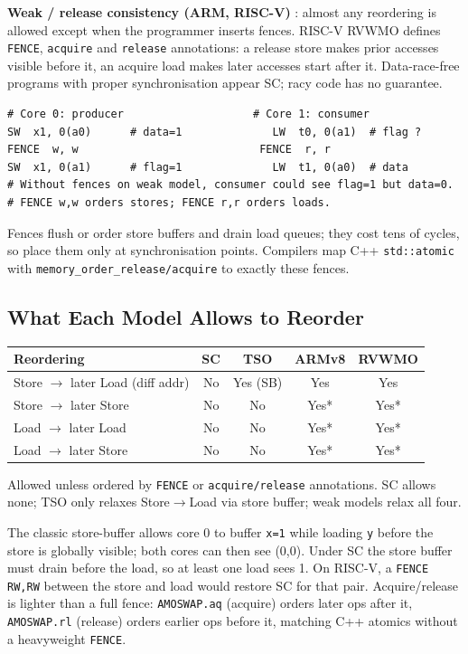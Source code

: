 \textbf{Weak / release consistency (ARM, RISC-V) }: almost any reordering is allowed except when the programmer inserts fences. RISC-V RVWMO defines \texttt{FENCE}, \texttt{acquire} and \texttt{release} annotations: a release store makes prior accesses visible before it, an acquire load makes later accesses start after it. Data-race-free programs with proper synchronisation appear SC; racy code has no guarantee.

\begin{lstlisting}[language={[x86masm]Assembler}, caption={Fences restore ordering in RISC-V}, label={lst:fence}]
# Core 0: producer                    # Core 1: consumer
SW  x1, 0(a0)      # data=1              LW  t0, 0(a1)  # flag ?
FENCE  w, w                            FENCE  r, r
SW  x1, 0(a1)      # flag=1              LW  t1, 0(a0)  # data
# Without fences on weak model, consumer could see flag=1 but data=0.
# FENCE w,w orders stores; FENCE r,r orders loads.
\end{lstlisting}

Fences flush or order store buffers and drain load queues; they cost tens of cycles, so place them only at synchronisation points. Compilers map C++ \texttt{std::atomic} with \texttt{memory\_order\_release/acquire} to exactly these fences.

\subsection{What Each Model Allows to Reorder}
\begin{center}
\begin{tabular}{lcccc}
\toprule Reordering & SC & TSO & ARMv8 & RVWMO \\ \midrule
Store $\to$ later Load (diff addr) & No & Yes (SB) & Yes & Yes \\
Store $\to$ later Store & No & No & Yes* & Yes* \\
Load $\to$ later Load & No & No & Yes* & Yes* \\
Load $\to$ later Store & No & No & Yes* & Yes* \\ \bottomrule
\end{tabular}
\end{center}
{\footnotesize *Allowed unless ordered by \texttt{FENCE} or \texttt{acquire/release} annotations. SC allows none; TSO only relaxes Store$\to$Load via store buffer; weak models relax all four.}

The classic store-buffer allows core 0 to buffer \texttt{x=1} while loading \texttt{y} before the store is globally visible; both cores can then see (0,0). Under SC the store buffer must drain before the load, so at least one load sees 1. On RISC-V, a \texttt{FENCE RW,RW} between the store and load would restore SC for that pair. Acquire/release is lighter than a full fence: \texttt{AMOSWAP.aq} (acquire) orders later ops after it, \texttt{AMOSWAP.rl} (release) orders earlier ops before it, matching C++ atomics without a heavyweight \texttt{FENCE}.

